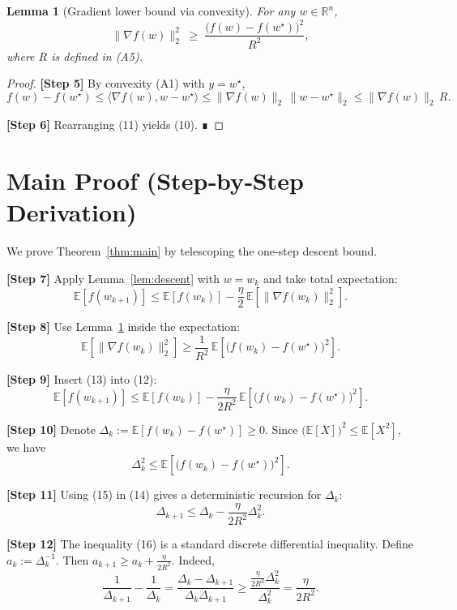\documentclass{article}
\newtheorem{lemma}{Lemma}
\newcommand{\E}{\mathbb{E}}
\newcommand{\R}{\mathbb{R}}
\begin{document}
\begin{lemma}[Gradient lower bound via convexity]
\label{lem:gradlb}
For any $w\in\R^{n}$,
\[
\|\nabla f(w)\|_{2}^{2}\;\ge\;\frac{\bigl(f(w)-f(w^{\star})\bigr)^{2}}{R^{2}},
\tag{10}
\]
where $R$ is defined in (A5).
\end{lemma}
\begin{proof}
\textbf{[Step 5]} By convexity (A1) with $y=w^{\star}$,
\[
f(w)-f(w^{\star})\le\langle\nabla f(w),w-w^{\star}\rangle
\le\|\nabla f(w)\|_{2}\,\|w-w^{\star}\|_{2}\le\|\nabla f(w)\|_{2}\,R.
\tag{11}
\]

\textbf{[Step 6]} Rearranging (11) yields (10). ∎
\end{proof}

\section*{Main Proof (Step‑by‑Step Derivation)}
We prove Theorem~\ref{thm:main} by telescoping the one‑step descent bound.

\textbf{[Step 7]} Apply Lemma~\ref{lem:descent} with $w=w_k$ and take total expectation:
\[
\E\!\left[f(w_{k+1})\right]\le \E\!\left[f(w_{k})\right]
-\frac{\eta}{2}\,\E\!\left[\|\nabla f(w_{k})\|_{2}^{2}\right].
\tag{12}
\]

\textbf{[Step 8]} Use Lemma~\ref{lem:gradlb} inside the expectation:
\[
\E\!\left[\|\nabla f(w_{k})\|_{2}^{2}\right]
\ge \frac{1}{R^{2}}\,
\E\!\left[\bigl(f(w_{k})-f(w^{\star})\bigr)^{2}\right].
\tag{13}
\]

\textbf{[Step 9]} Insert (13) into (12):
\[
\E\!\left[f(w_{k+1})\right]\le \E\!\left[f(w_{k})\right]
-\frac{\eta}{2R^{2}}\,
\E\!\left[\bigl(f(w_{k})-f(w^{\star})\bigr)^{2}\right].
\tag{14}
\]

\textbf{[Step 10]} Denote $\Delta_k:=\E\!\left[f(w_{k})-f(w^{\star})\right]\ge0$.  
Since $\bigl(\E[X]\bigr)^{2}\le \E[X^{2}]$, we have
\[
\Delta_{k}^{2}\le \E\!\left[\bigl(f(w_{k})-f(w^{\star})\bigr)^{2}\right].
\tag{15}
\]

\textbf{[Step 11]} Using (15) in (14) gives a deterministic recursion for $\Delta_k$:
\[
\Delta_{k+1}\le \Delta_{k}-\frac{\eta}{2R^{2}}\Delta_{k}^{2}.
\tag{16}
\]

\textbf{[Step 12]} The inequality (16) is a standard discrete differential inequality.  
Define $a_k:=\Delta_k^{-1}$. Then $a_{k+1}\ge a_k+\frac{\eta}{2R^{2}}$.
Indeed,
\[
\frac{1}{\Delta_{k+1}}-\frac{1}{\Delta_{k}}
=\frac{\Delta_{k}-\Delta_{k+1}}{\Delta_{k}\Delta_{k+1}}
\ge\frac{\frac{\eta}{2R^{2}}\Delta_{k}^{2}}{\Delta_{k}^{2}}
=\frac{\eta}{2R^{2}}.
\tag{17}
\]
\end{document}

